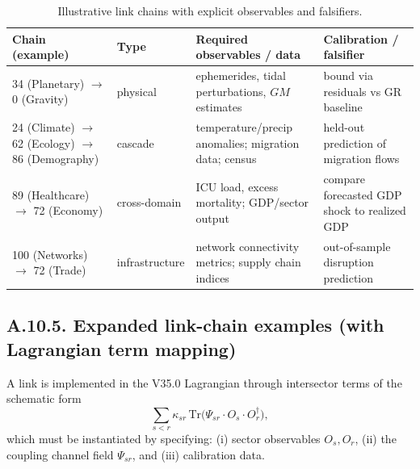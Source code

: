 \documentclass[13pt,a4paper]{article}
\begin{document}
	\begin{table}[htbp]
		\centering
		\small
		\begin{tabular}{p{}p{}p{}p{}}
			\toprule
			\textbf{Chain (example)} & \textbf{Type} & \textbf{Required observables / data} & \textbf{Calibration / falsifier} \\
			\midrule
			34 (Planetary) $\to$ 0 (Gravity) & physical & ephemerides, tidal perturbations, $GM$ estimates & bound via residuals vs GR baseline \\
			\midrule
			24 (Climate) $\to$ 62 (Ecology) $\to$ 86 (Demography) & cascade & temperature/precip anomalies; migration data; census & held-out prediction of migration flows \\
			\midrule
			89 (Healthcare) $\to$ 72 (Economy) & cross-domain & ICU load, excess mortality; GDP/sector output & compare forecasted GDP shock to realized GDP \\
			\midrule
			100 (Networks) $\to$ 72 (Trade) & infrastructure & network connectivity metrics; supply chain indices & out-of-sample disruption prediction \\
			\bottomrule
		\end{tabular}
		\caption{Illustrative link chains with explicit observables and falsifiers.}
		\label{tab:link-chains-auditable}
	\end{table}
	\subsection*{A.10.5. Expanded link-chain examples (with Lagrangian term mapping)}
	
	A link is implemented in the V35.0 Lagrangian through intersector terms of the schematic form
	$$
	\sum_{s<r}\kappa_{sr}\,\mathrm{Tr}\!\big(\Psi_{sr}\cdot O_s\cdot O_r^\dagger\big),
	$$
	which must be instantiated by specifying: (i) sector observables $O_s,O_r$, (ii) the coupling channel field $\Psi_{sr}$, and (iii) calibration data.
	
\end{document}
